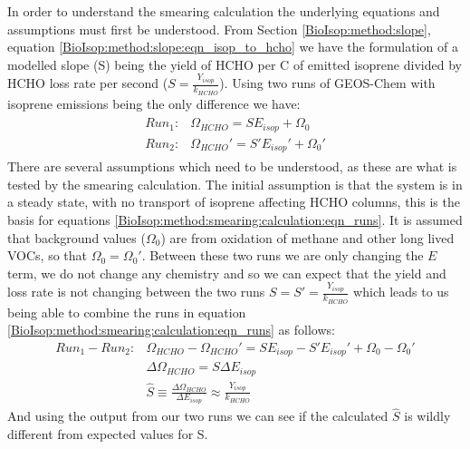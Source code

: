       In order to understand the smearing calculation the underlying equations and assumptions must first be understood.
      From Section \ref{BioIsop:method:slope}, equation \ref{BioIsop:method:slope:eqn_isop_to_hcho} we have the formulation of a modelled slope (S) being the yield of HCHO per C of emitted isoprene divided by HCHO loss rate per second ($S = \frac{Y_{isop}}{k_{HCHO}}$).
      Using two runs of GEOS-Chem with isoprene emissions being the only difference we have:
      \begin{eqnarray}
        \label{BioIsop:method:smearing:calculation:eqn_runs}
        \begin{split}
        Run_1 :&  \Omega_{HCHO} = S E_{isop} + \Omega_0 \\
        Run_2 :&  \Omega_{HCHO}' = S' E_{isop}' + \Omega_0' 
        \end{split}
      \end{eqnarray}
      There are several assumptions which need to be understood, as these are what is tested by the smearing calculation.
      The initial assumption is that the system is in a steady state, with no transport of isoprene affecting HCHO columns, this is the basis for equations \ref{BioIsop:method:smearing:calculation:eqn_runs}.
      It is assumed that background values ($\Omega_0$) are from oxidation of methane and other long lived VOCs, so that $\Omega_0 = \Omega_0'$.
      Between these two runs we are only changing the $E$ term, we do not change any chemistry and so we can expect that the yield and loss rate is not changing between the two runs $S = S' = \frac{Y_{isop}}{k_{HCHO}}$
      which leads to us being able to combine the runs in equation \ref{BioIsop:method:smearing:calculation:eqn_runs} as follows:
      \begin{eqnarray}
        \label{BioIsop:method:smearing:calculation:eqn_hats}
        Run_1-Run_2 :& \Omega_{HCHO} - \Omega_{HCHO}' = S E_{isop} - S' E_{isop}' +\Omega_0 - \Omega_0' \\
        & \Delta \Omega_{HCHO} = S \Delta E_{isop} \\
        & \hat{S} \equiv \frac{\Delta{\Omega_{HCHO}}}{\Delta E_{isop}} \approx \frac{Y_{isop}}{k_{HCHO}}
      \end{eqnarray}
      And using the output from our two runs we can see if the calculated $\hat{S}$ is wildly different from expected values for S.
      
